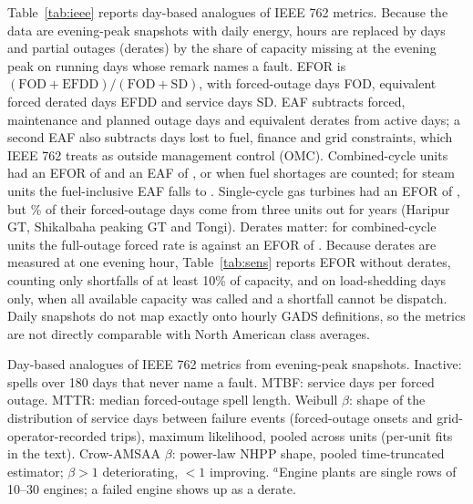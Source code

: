 \documentclass[11pt]{article}
\begin{document}
Table~\ref{tab:ieee} reports day-based analogues of IEEE 762 metrics. Because the data are evening-peak snapshots with daily energy, hours are replaced by days and partial outages (derates) by the share of capacity missing at the evening peak on running days whose remark names a fault. EFOR is $(\mathrm{FOD}+\mathrm{EFDD})/(\mathrm{FOD}+\mathrm{SD})$, with forced-outage days FOD, equivalent forced derated days EFDD and service days SD. EAF subtracts forced, maintenance and planned outage days and equivalent derates from active days; a second EAF also subtracts days lost to fuel, finance and grid constraints, which IEEE 762 treats as outside management control (OMC). Combined-cycle units had an EFOR of \ieeeCcEFOR{} and an EAF of \ieeeCcEAF, or \ieeeCcEAFomc{} when fuel shortages are counted; for steam units the fuel-inclusive EAF falls to \ieeeStEAFomc. Single-cycle gas turbines had an EFOR of \ieeeGtEFOR, but \gtTopThreeShare\% of their forced-outage days come from three units out for years (Haripur GT, Shikalbaha peaking GT and Tongi). Derates matter: for combined-cycle units the full-outage forced rate is \ieeeCcFOR{} against an EFOR of \ieeeCcEFOR. Because derates are measured at one evening hour, Table~\ref{tab:sens} reports EFOR without derates, counting only shortfalls of at least 10\% of capacity, and on load-shedding days only, when all available capacity was called and a shortfall cannot be dispatch. Daily snapshots do not map exactly onto hourly GADS definitions, so the metrics are not directly comparable with North American class averages.

\begin{table}[t]
\centering\footnotesize
\caption{Reliability metrics by technology, October 2019 -- December 2024}\label{tab:ieee}
\begin{threeparttable}

\begin{tablenotes}\footnotesize
\item Day-based analogues of IEEE 762 metrics from evening-peak snapshots. Inactive: spells over 180 days that never name a fault. MTBF: service days per forced outage. MTTR: median forced-outage spell length. Weibull $\beta$: shape of the distribution of service days between failure events (forced-outage onsets and grid-operator-recorded trips), maximum likelihood, pooled across units (per-unit fits in the text). Crow-AMSAA $\beta$: power-law NHPP shape, pooled time-truncated estimator; $\beta>1$ deteriorating, $<1$ improving. $^a$Engine plants are single rows of 10--30 engines; a failed engine shows up as a derate.
\end{tablenotes}
\end{threeparttable}
\end{table}
\end{document}
